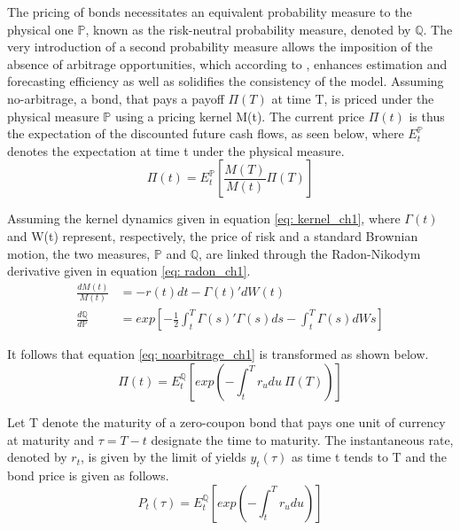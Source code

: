 The pricing of bonds necessitates an equivalent probability measure to the physical one \(\mathbb{P}\), known as the risk-neutral probability measure, denoted by \(\mathbb{Q}\). The very introduction of a second probability measure allows the imposition of the absence of arbitrage opportunities, which according to \cite{almeida_2008}, enhances estimation and forecasting efficiency as well as solidifies the consistency of the model. Assuming no-arbitrage, a bond, that pays a payoff \(\Pi(T)\) at time T, is priced under the physical measure \(\mathbb{P}\) using a pricing kernel M(t). The current price \(\Pi(t)\) is thus the expectation of the discounted future cash flows, as seen below, where \(E^\mathbb{P}_t\) denotes the expectation at time t under the physical measure.
\begin{equation}
\Pi(t)=E^\mathbb{P}_t\left[\frac{M(T)}{M(t)}\Pi(T)\right] \label{eq: noarbitrage_ch1}
\end{equation} 
 
Assuming the kernel dynamics given in equation \ref{eq: kernel_ch1}, where \(\Gamma(t)\) and W(t) represent, respectively, the price of risk and a standard Brownian motion, the two measures, \(\mathbb{P}\) and \(\mathbb{Q}\), are linked through the Radon-Nikodym derivative given in equation \ref{eq: radon_ch1}.
\begin{align}
\frac{dM(t)}{M(t)}&=-r(t)dt-\Gamma(t)'dW(t) \label{eq: kernel_ch1}\\
\frac{d\mathbb{Q}}{d\mathbb{P}}&=exp\left[-\frac{1}{2}\int^T_t\Gamma(s)'\Gamma(s)ds-\int^T_t\Gamma(s)dWs\right] \label{eq: radon_ch1}
\end{align}  

It follows that equation \ref{eq: noarbitrage_ch1} is transformed as shown below.
\begin{equation}
\Pi(t)=E^\mathbb{Q}_t\left[exp\left(-\int^T_tr_udu \: \Pi(T)\right)\right] \label{eq: bond_price_yield_ch1}
\end{equation}  

Let T denote the maturity of a zero-coupon bond that pays one unit of currency at maturity and \(\tau=T-t\) designate the time to maturity. The instantaneous rate, denoted by \(r_t\), is given by the limit of yields \(y_t(\tau)\) as time t tends to T and the bond price is given as follows. 
\begin{equation}
P_t\left(\tau\right)=E^\mathbb{Q}_t\left[exp\left(-\int^T_tr_udu\right)\right] \label{eq: zcb_price_yield_ch1}
\end{equation}  

